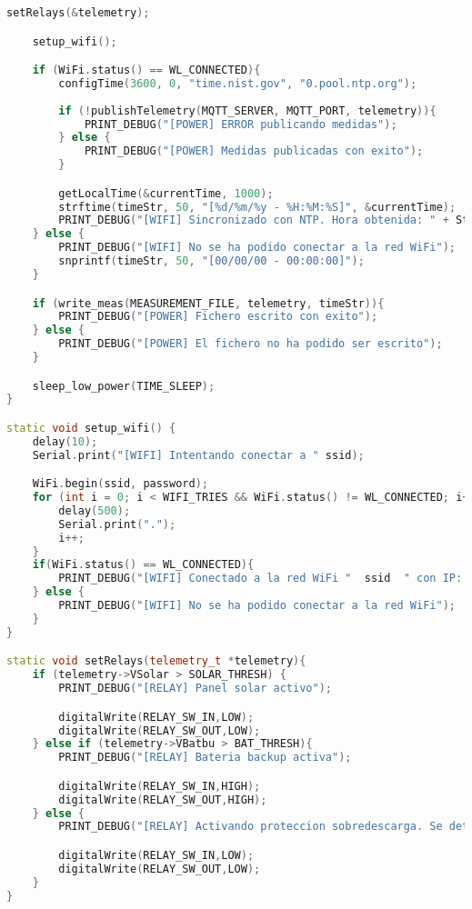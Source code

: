 \begin{lstlisting}[language=c++,caption={Fichero\texttt{MAIN\_POWER.ino}}, captionpos=b]
    setRelays(&telemetry);

    setup_wifi();

    if (WiFi.status() == WL_CONNECTED){
        configTime(3600, 0, "time.nist.gov", "0.pool.ntp.org");
        
        if (!publishTelemetry(MQTT_SERVER, MQTT_PORT, telemetry)){
            PRINT_DEBUG("[POWER] ERROR publicando medidas");
        } else {
            PRINT_DEBUG("[POWER] Medidas publicadas con exito");
        }

        getLocalTime(&currentTime, 1000);
        strftime(timeStr, 50, "[%d/%m/%y - %H:%M:%S]", &currentTime);
        PRINT_DEBUG("[WIFI] Sincronizado con NTP. Hora obtenida: " + String(timeStr));
    } else {
        PRINT_DEBUG("[WIFI] No se ha podido conectar a la red WiFi");
        snprintf(timeStr, 50, "[00/00/00 - 00:00:00]");
    }

    if (write_meas(MEASUREMENT_FILE, telemetry, timeStr)){
        PRINT_DEBUG("[POWER] Fichero escrito con exito");
    } else {
        PRINT_DEBUG("[POWER] El fichero no ha podido ser escrito");
    }

    sleep_low_power(TIME_SLEEP);
}

static void setup_wifi() {
    delay(10);
    Serial.print("[WIFI] Intentando conectar a " ssid);

    WiFi.begin(ssid, password);
    for (int i = 0; i < WIFI_TRIES && WiFi.status() != WL_CONNECTED; i++) {
        delay(500);
        Serial.print(".");
        i++;
    }
    if(WiFi.status() == WL_CONNECTED){
        PRINT_DEBUG("[WIFI] Conectado a la red WiFi "  ssid  " con IP: "); PRINT_DEBUG(WiFi.localIP());
    } else {
        PRINT_DEBUG("[WIFI] No se ha podido conectar a la red WiFi");
    }
}

static void setRelays(telemetry_t *telemetry){
    if (telemetry->VSolar > SOLAR_THRESH) {
        PRINT_DEBUG("[RELAY] Panel solar activo");

        digitalWrite(RELAY_SW_IN,LOW);
        digitalWrite(RELAY_SW_OUT,LOW);  
    } else if (telemetry->VBatbu > BAT_THRESH){
        PRINT_DEBUG("[RELAY] Bateria backup activa");

        digitalWrite(RELAY_SW_IN,HIGH);
        digitalWrite(RELAY_SW_OUT,HIGH);
    } else {
        PRINT_DEBUG("[RELAY] Activando proteccion sobredescarga. Se detendra el sistema");

        digitalWrite(RELAY_SW_IN,LOW);
        digitalWrite(RELAY_SW_OUT,LOW);
    }
}
\end{lstlisting}

